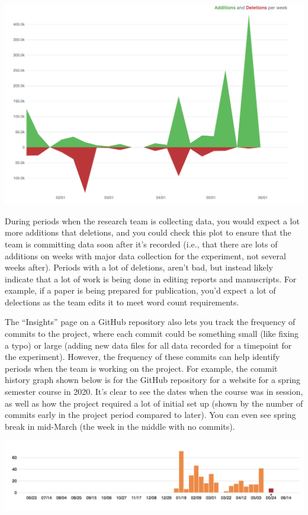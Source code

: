 \documentclass[]{tufte-book}
\begin{document}
\includegraphics[width=24in]{figures/github_code_frequency}

During periods when the research team is collecting data, you would expect
a lot more additions that deletions, and you could check this plot to ensure that the
team is committing data soon after it's recorded (i.e., that there are lots of additions
on weeks with major data collection for the experiment, not several weeks after).
Periods with a lot of deletions, aren't bad, but instead likely indicate that a lot of
work is being done in editing reports and manuscripts. For example, if a paper is being
prepared for publication, you'd expect a lot of delections as the team edits it to meet
word count requirements.

The ``Insights'' page on a GitHub repository also lets you track the frequency of commits
to the project, where each commit could be something small (like fixing a typo) or
large (adding new data files for all data recorded for a timepoint for the experiment).
However, the frequency of these commits can help identify periods when the team is working
on the project. For example, the commit history graph shown below is for the GitHub
repository for a website for a spring semester course in 2020. It's clear to see the
dates when the course was in session, as well as how the project required a lot of
initial set up (shown by the number of commits early in the project period compared
to later). You can even see spring break in mid-March (the week in the middle with no
commits).

\includegraphics[width=20.53in]{figures/github_commit_frequency}
\end{document}
